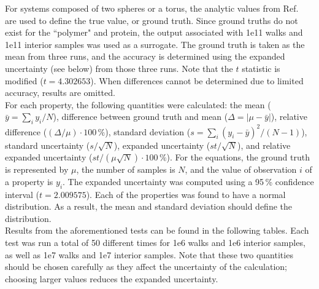 \documentclass[12pt,letterpaper]{article}
\begin{document}
\noindent For systems composed of two spheres or a torus, the analytic values from Ref.~\cite{Mansfield2001} are used to define the true value, or ground truth. Since ground truths do not exist for the ``polymer" and protein, the output associated with 1e11 walks and 1e11 interior samples was used as a surrogate. The ground truth is taken as the mean from three runs, and the accuracy is determined using the expanded uncertainty (see below) from those three runs. Note that the $t$ statistic is modified ($t=4.302653$). When differences cannot be determined due to limited accuracy, results are omitted.\\

\noindent For each property, the following quantities were calculated: the mean ($\bar{y}=\sum_{i} y_{i}/N$), difference between ground truth and mean ($\Delta=|\mu-\bar{y}|$), relative difference (${(\Delta / \mu) \cdot 100\,\%}$), standard deviation ($s=\sum_{i} (y_{i}-\bar{y})^{2}/(N-1)$), standard uncertainty ($s/\sqrt{N}$), expanded uncertainty ($st/\sqrt{N}$), and relative expanded uncertainty ($st/(\mu\sqrt{N}) \cdot 100\,\%$). For the equations, the ground truth is represented by $\mu$, the number of samples is $N$, and the value of observation $i$ of a property is $y_{i}$. The expanded uncertainty was computed using a 95\,\% confidence interval ($t=2.009575$). Each of the properties was found to have a normal distribution. As a result, the mean and standard deviation should define the distribution. \\

\noindent Results from the aforementioned tests can be found in the following tables. Each test was run a total of 50 different times for 1e6 walks and 1e6 interior samples, as well as 1e7 walks and 1e7 interior samples. Note that these two quantities should be chosen carefully as they affect the uncertainty of the calculation; choosing larger values reduces the expanded uncertainty.
\end{document}

